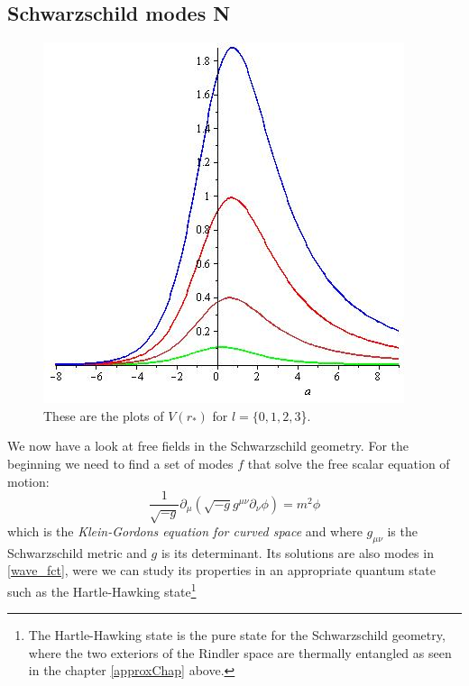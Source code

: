 \subsection{Schwarzschild modes \textbf{N}}
	\begin{figure} [tbp]
		\begin{center}
			\includegraphics[scale=0.5]{plots_of_V}
			\caption{These are the plots of $V(r_*)$ for $l=\{0,1,2,3$\}.} \label{plots_of_V}
		\end{center}
	\end{figure} %

	We now have a look at free fields in the Schwarzschild geometry. For the beginning we need to find a set of modes $f$ that solve the free scalar equation of motion:
		\begin{equation} \label{Klein_Gordon_curved}
			\frac{1}{\sqrt{-g}} \partial_\mu (\sqrt{-g} g^{\mu \nu} \partial_\nu \phi)
			= m^2 \phi
		\end{equation}
	which is the \textit{Klein-Gordons equation for curved space} and where $g_{\mu \nu}$ is the Schwarzschild metric and $g$ is its determinant. Its solutions are also modes in \eqref{wave_fct}, were we can study its properties in an appropriate quantum state such as the Hartle-Hawking state\footnote{The Hartle-Hawking state is the pure state for the Schwarzschild geometry, where the two exteriors of the Rindler space are thermally entangled as seen in the chapter \ref{approxChap} above.}
	
